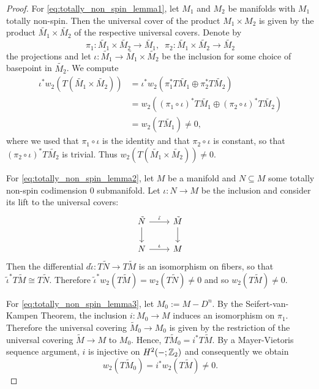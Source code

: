 \begin{proof}
    For \ref{eq:totally_non_spin_lemma1}, let $M_1$ and $M_2$ be manifolds with $M_1$ totally non-spin. Then the universal cover of the product $M_1 \times M_2$ is given by the product $\tilde{M_1} \times \tilde{M_2}$ of the respective universal covers. Denote by 
    \[
    \pi_1 \colon \tilde{M_1} \times \tilde{M_2} \to \tilde{M_1}, \; \;  \pi_2 \colon \tilde{M_1} \times \tilde{M_2} \to \tilde{M_2}
    \]
    the projections and let $\iota \colon \tilde{M_1} \to \tilde{M_1} \times \tilde{M_2}$ be the inclusion for some choice of basepoint in $\tilde{M_2}$. We compute 
    \begin{align*}
    \iota^\ast w_2(T(\tilde{M_1} \times \tilde{M_2})) & = \iota^\ast w_2(\pi_1^\ast T \tilde{M_1} \oplus \pi_2^\ast T \tilde{M_2}) \\
    & = w_2((\pi_1 \circ \iota)^\ast T\tilde{M_1} \oplus (\pi_2 \circ \iota)^\ast T\tilde{M_2} ) \\
    & = w_2(T \tilde{M_1}) \neq 0,
    \end{align*}
    where we used that $\pi_1 \circ \iota$ is the identity and that $\pi_2 \circ \iota$ is constant, so that $(\pi_2 \circ \iota)^\ast T\tilde{M_2}$ is trivial. Thus $w_2(T(\tilde{M_1} \times \tilde{M_2})) \neq 0$.

    For \ref{eq:totally_non_spin_lemma2}, let $M$ be a manifold and $N \subseteq M$ some totally non-spin codimension $0$ submanifold. Let $\iota \colon N \to M$ be the inclusion and consider its lift to the universal covers:
    \[\begin{tikzcd}
	{\tilde{N}} & {\tilde{M}} \\
	N & M
	\arrow["{\tilde{\iota}}", from=1-1, to=1-2]
	\arrow[from=1-1, to=2-1]
	\arrow[from=1-2, to=2-2]
	\arrow["\iota", from=2-1, to=2-2]
    \end{tikzcd}\]
    Then the differential $d \tilde{\iota} \colon T\tilde{N} \to T\tilde{M}$ is an isomorphism on fibers, so that $\tilde{\iota}^\ast T\tilde{M} \cong T\tilde{N}$. Therefore $\tilde{\iota}^\ast w_2(T\tilde{M}) = w_2(T\tilde{N}) \neq 0$ and so $w_2(T\tilde{M}) \neq 0$. 
    
    For \ref{eq:totally_non_spin_lemma3}, let $M_0 := M - D^n$. By the Seifert-van-Kampen Theorem, the inclusion \linebreak $i \colon M_0 \to M$ induces an isomorphism on $\pi_1$. Therefore the universal covering $\tilde{M}_0 \to M_0$ is given by the restriction of the universal covering $\tilde{M} \to M$ to $M_0$. Hence, $T\tilde{M}_0 = i^\ast T\tilde{M}$. By a Mayer-Vietoris sequence argument, $i$ is injective on $H^2(-;\mathbb{Z}_2)$ and consequently we obtain 
    \[
    w_2(T\tilde{M}_0) = i^\ast w_2(T\tilde{M}) \neq 0.
    \]
\end{proof}